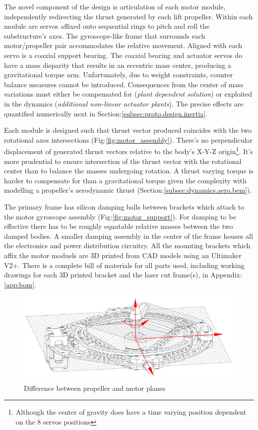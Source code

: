 The novel component of the design is articulation of each motor module, independently redirecting the thrust generated by each lift propeller. Within each module are servos affixed onto sequential rings to pitch and roll the substructure's axes. The gyroscope-like frame that surrounds each motor/propeller pair accommodates the relative movement. Aligned with each servo is a coaxial support bearing. The coaxial bearing and actuator servos do have a mass disparity that results in an eccentric mass center, producing a gravitational torque arm. Unfortunately, due to weight constraints, counter balance measures cannot be introduced. Consequences from the center of mass variations must either be compensated for (\emph{plant dependent solution}) or exploited in the dynamics (\emph{additional non-linear actuator plants}). The precise effects are quantified numerically next in Section:\ref{subsec:proto.design.inertia}.
\par
Each module is designed such that thrust vector produced coincides with the two rotational axes intersections (Fig:\ref{fig:motor_assembly}). There's no perpendicular displacement of generated thrust vectors relative to the body's X-Y-Z origin\footnote{Although the center of gravity does have a time varying position dependent on the 8 servos positions}. It's more prudential to ensure intersection of the thrust vector with the rotational center than to balance the masses undergoing rotation. A thrust varying torque is harder to compensate for than a gravitational torque given the complexity with modelling a propeller's aerodynamic thrust (Section:\ref{subsec:dynamics.aero.bem}).
\par
The primary frame has silicon damping balls between brackets which attach to the motor gyroscope assembly (Fig:\ref{fig:motor_support}). For damping to be effective there has to be roughly equatable relative masses between the two damped bodies. A smaller damping assembly in the center of the frame houses all the electronics and power distribution circuitry. All the mounting brackets which affix the motor moduels are 3D printed from CAD models using an Ultimaker V2+\cite{ultimaker}. There is a complete bill of materials for all parts used, including working drawings for each 3D printed bracket and the laser cut frame(s), in Appendix:\ref{app:bom}.
\par
\begin{figure}[hbtp]
\centering
\includegraphics[width=\textwidth]{figs/motor-prop}
\caption{Difference between propeller and motor planes}
\label{fig:motor_prop}
\end{figure}
